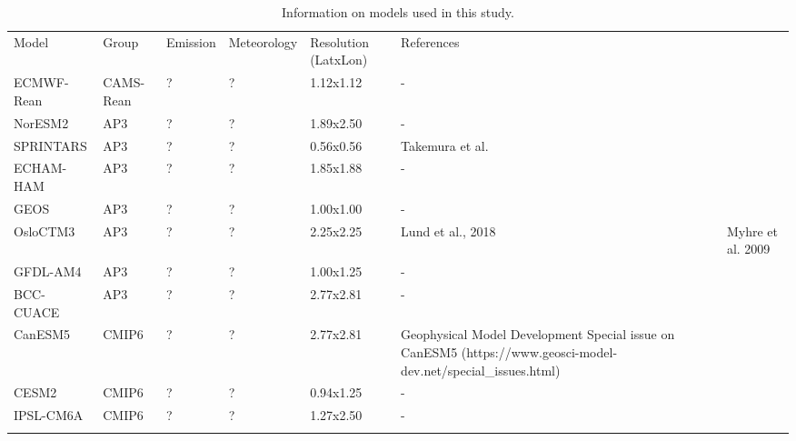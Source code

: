 \documentclass[journal abbreviation, manuscript]{copernicus}
\begin{document}
\begin{table}
 \begin{tabularx}{\textwidth}{lllllX}
  \tophline
  Model      & Group     & Emission & Meteorology & Resolution (LatxLon) & References                                                                                                                         \\
  \middlehline
  ECMWF-Rean & CAMS-Rean & ?        & ?           & 1.12x1.12            & -                                                                                                                                  \\
  NorESM2    & AP3       & ?        & ?           & 1.89x2.50            & -                                                                                                                                  \\
  SPRINTARS  & AP3       & ?        & ?           & 0.56x0.56            & Takemura et al.                                                                                                                    \\
  ECHAM-HAM  & AP3       & ?        & ?           & 1.85x1.88            & -                                                                                                                                  \\
  GEOS       & AP3       & ?        & ?           & 1.00x1.00            & -                                                                                                                                  \\
  OsloCTM3   & AP3       & ?        & ?           & 2.25x2.25            & Lund et al., 2018                                                                                              & Myhre et al. 2009 \\
  GFDL-AM4   & AP3       & ?        & ?           & 1.00x1.25            & -                                                                                                                                  \\
  BCC-CUACE  & AP3       & ?        & ?           & 2.77x2.81            & -                                                                                                                                  \\
  CanESM5    & CMIP6     & ?        & ?           & 2.77x2.81            & Geophysical Model Development Special issue on CanESM5 (https://www.geosci-model-dev.net/special\_issues.html)                     \\
  CESM2      & CMIP6     & ?        & ?           & 0.94x1.25            & -                                                                                                                                  \\
  IPSL-CM6A  & CMIP6     & ?        & ?           & 1.27x2.50            & -                                                                                                                                  \\
  \bottomhline
 \end{tabularx}
 \caption{Information on models used in this study.}
 \label{table:models}
\end{table}
\end{document}
